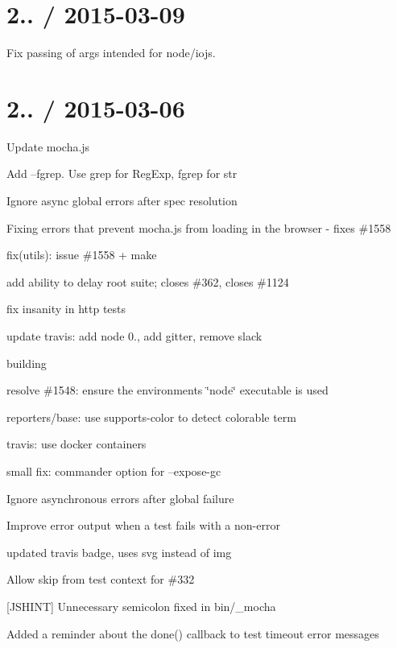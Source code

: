 \section*{2.. / 2015-\/03-\/09}


\begin{DoxyItemize}
\item Fix passing of args intended for node/iojs.
\end{DoxyItemize}

\section*{2.. / 2015-\/03-\/06}


\begin{DoxyItemize}
\item Update mocha.\+js
\item Add --fgrep. Use grep for Reg\+Exp, fgrep for str
\item Ignore async global errors after spec resolution
\item Fixing errors that prevent mocha.\+js from loading in the browser -\/ fixes \#1558
\item fix(utils)\+: issue \#1558 + make
\item add ability to delay root suite; closes \#362, closes \#1124
\item fix insanity in http tests
\item update travis\+: add node 0., add gitter, remove slack
\item building
\item resolve \#1548\+: ensure the environment\textquotesingle{}s \char`\"{}node\char`\"{} executable is used
\item reporters/base\+: use supports-\/color to detect colorable term
\item travis\+: use docker containers
\item small fix\+: commander option for --expose-\/gc
\item Ignore asynchronous errors after global failure
\item Improve error output when a test fails with a non-\/error
\item updated travis badge, uses svg instead of img
\item Allow skip from test context for \#332
\item \mbox{[}J\+S\+H\+I\+NT\mbox{]} Unnecessary semicolon fixed in bin/\+\_\+mocha
\item Added a reminder about the done() callback to test timeout error messages

\end{DoxyItemize}
